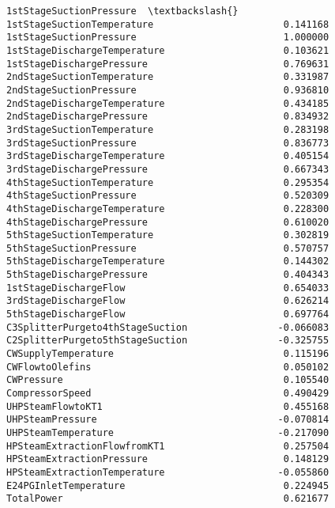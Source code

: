 \documentclass[11pt]{article}
\begin{document}
\begin{tcolorbox}[breakable, size=fbox, boxrule=.5pt, pad at break*=1mm, opacityfill=0]
\begin{Verbatim}[commandchars=\\\{\}]
                                  1stStageSuctionPressure  \textbackslash{}
1stStageSuctionTemperature                       0.141168
1stStageSuctionPressure                          1.000000
1stStageDischargeTemperature                     0.103621
1stStageDischargePressure                        0.769631
2ndStageSuctionTemperature                       0.331987
2ndStageSuctionPressure                          0.936810
2ndStageDischargeTemperature                     0.434185
2ndStageDischargePressure                        0.834932
3rdStageSuctionTemperature                       0.283198
3rdStageSuctionPressure                          0.836773
3rdStageDischargeTemperature                     0.405154
3rdStageDischargePressure                        0.667343
4thStageSuctionTemperature                       0.295354
4thStageSuctionPressure                          0.520309
4thStageDischargeTemperature                     0.228300
4thStageDischargePressure                        0.610020
5thStageSuctionTemperature                       0.302819
5thStageSuctionPressure                          0.570757
5thStageDischargeTemperature                     0.144302
5thStageDischargePressure                        0.404343
1stStageDischargeFlow                            0.654033
3rdStageDischargeFlow                            0.626214
5thStageDischargeFlow                            0.697764
C3SplitterPurgeto4thStageSuction                -0.066083
C2SplitterPurgeto5thStageSuction                -0.325755
CWSupplyTemperature                              0.115196
CWFlowtoOlefins                                  0.050102
CWPressure                                       0.105540
CompressorSpeed                                  0.490429
UHPSteamFlowtoKT1                                0.455168
UHPSteamPressure                                -0.070814
UHPSteamTemperature                             -0.217090
HPSteamExtractionFlowfromKT1                     0.257504
HPSteamExtractionPressure                        0.148129
HPSteamExtractionTemperature                    -0.055860
E24PGInletTemperature                            0.224945
TotalPower                                       0.621677


\end{Verbatim}
\end{tcolorbox}
\end{document}
